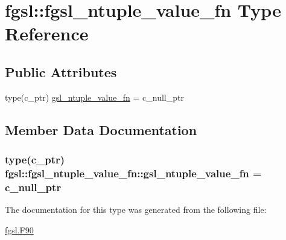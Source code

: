 \hypertarget{structfgsl_1_1fgsl__ntuple__value__fn}{\section{fgsl\-:\-:fgsl\-\_\-ntuple\-\_\-value\-\_\-fn Type Reference}
\label{structfgsl_1_1fgsl__ntuple__value__fn}
}
\subsection*{Public Attributes}
\begin{DoxyCompactItemize}
\item 
type(c\-\_\-ptr) \hyperlink{structfgsl_1_1fgsl__ntuple__value__fn_a3df6fe4aa584fbd77e7c9ce3fe29059f}{gsl\-\_\-ntuple\-\_\-value\-\_\-fn} = c\-\_\-null\-\_\-ptr
\end{DoxyCompactItemize}


\subsection{Member Data Documentation}
\hypertarget{structfgsl_1_1fgsl__ntuple__value__fn_a3df6fe4aa584fbd77e7c9ce3fe29059f}{
\subsubsection[{gsl\-\_\-ntuple\-\_\-value\-\_\-fn}]{\setlength{\rightskip}{0pt plus 5cm}type(c\-\_\-ptr) fgsl\-::fgsl\-\_\-ntuple\-\_\-value\-\_\-fn\-::gsl\-\_\-ntuple\-\_\-value\-\_\-fn = c\-\_\-null\-\_\-ptr}}\label{structfgsl_1_1fgsl__ntuple__value__fn_a3df6fe4aa584fbd77e7c9ce3fe29059f}


The documentation for this type was generated from the following file\-:\begin{DoxyCompactItemize}
\item 
\hyperlink{fgsl_8F90}{fgsl.\-F90}\end{DoxyCompactItemize}
